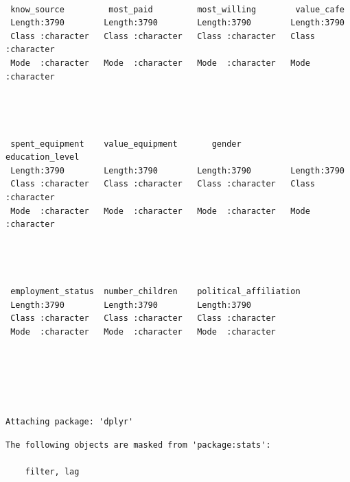 \documentclass[
  letterpaper,
  DIV=11,
  numbers=noendperiod]{scrartcl}
\begin{document}
\begin{verbatim}
                                                                            
 know_source         most_paid         most_willing        value_cafe       
 Length:3790        Length:3790        Length:3790        Length:3790       
 Class :character   Class :character   Class :character   Class :character  
 Mode  :character   Mode  :character   Mode  :character   Mode  :character  
                                                                            
                                                                            
                                                                            
                                                                            
 spent_equipment    value_equipment       gender          education_level   
 Length:3790        Length:3790        Length:3790        Length:3790       
 Class :character   Class :character   Class :character   Class :character  
 Mode  :character   Mode  :character   Mode  :character   Mode  :character  
                                                                            
                                                                            
                                                                            
                                                                            
 employment_status  number_children    political_affiliation
 Length:3790        Length:3790        Length:3790          
 Class :character   Class :character   Class :character     
 Mode  :character   Mode  :character   Mode  :character     
                                                            
                                                            
                                                            
                                                            
\end{verbatim}

\begin{verbatim}

Attaching package: 'dplyr'
\end{verbatim}

\begin{verbatim}
The following objects are masked from 'package:stats':

    filter, lag
\end{verbatim}
\end{document}
